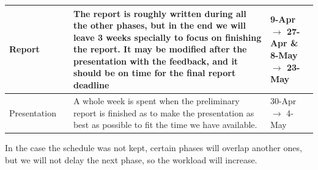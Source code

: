 \documentclass{article}
\begin{document}
\begin{center}
\begin{tabular}{|C{2cm}|C{2cm}|C{7cm}|C{3cm}|}
				Report & & The report is roughly written during all the other phases, but in the end we will leave 3  weeks specially to focus on finishing the report. It may be modified after the presentation with the feedback, and it should be on time for the final report deadline & 9-Apr $\rightarrow$ 27-Apr \& 8-May $\rightarrow$ 23-May \\ \hline
				
				Presentation & & A whole week is spent when the preliminary report is finished as to make the presentation as best as possible to fit the time we have available. & 30-Apr $\rightarrow$ 4-May \\ \hline
			\end{tabular}
		\end{center}
		\bigskip
		In the case the schedule was not kept, certain phases will overlap another ones, but we will not delay the next phase, so the workload will increase. 
		
\end{document}
